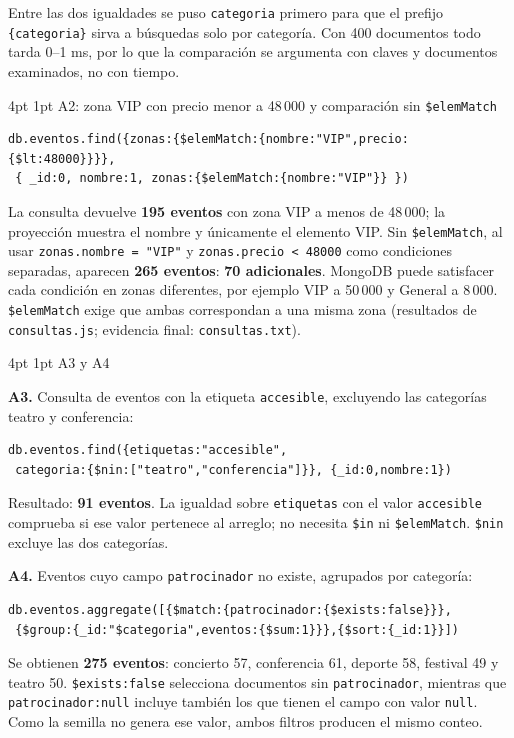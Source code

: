 \documentclass[10pt,letterpaper]{article}
\makeatletter
\renewcommand\subsection{\@startsection{subsection}{2}{\z@}%
  {4pt \@plus 1pt}{1pt}%
  {\normalfont\small\bfseries\color{acc}}}
\makeatother
\begin{document}
Entre las dos igualdades se puso \texttt{categoria} primero para que el prefijo \texttt{\{categoria\}} sirva a
búsquedas solo por categoría. Con 400 documentos todo tarda 0--1 ms, por lo que la comparación se argumenta
con claves y documentos examinados, no con tiempo.

\subsection{A2: zona VIP con precio menor a 48\,000 y comparación sin \texttt{\$elemMatch}}

{\footnotesize\begin{verbatim}
db.eventos.find({zonas:{$elemMatch:{nombre:"VIP",precio:{$lt:48000}}}},
 { _id:0, nombre:1, zonas:{$elemMatch:{nombre:"VIP"}} })
\end{verbatim}}
La consulta devuelve \textbf{195 eventos} con zona VIP a menos de 48\,000; la proyección
muestra el nombre y únicamente el elemento VIP. Sin \texttt{\$elemMatch}, al usar
\texttt{zonas.nombre = "VIP"} y \texttt{zonas.precio < 48000} como condiciones
separadas, aparecen \textbf{265 eventos}: \textbf{70 adicionales}. MongoDB puede
satisfacer cada condición en zonas diferentes, por ejemplo VIP a 50\,000 y
General a 8\,000. \texttt{\$elemMatch} exige que ambas correspondan a una
misma zona (resultados de \texttt{consultas.js}; evidencia final: \texttt{consultas.txt}).


\subsection{A3 y A4}

\textbf{A3.} Consulta de eventos con la etiqueta \texttt{accesible}, excluyendo las
categorías teatro y conferencia:
{\footnotesize\begin{verbatim}
db.eventos.find({etiquetas:"accesible",
 categoria:{$nin:["teatro","conferencia"]}}, {_id:0,nombre:1})
\end{verbatim}}
Resultado: \textbf{91 eventos}. La igualdad sobre \texttt{etiquetas} con el valor \texttt{accesible}
comprueba si ese valor pertenece al arreglo; no necesita \texttt{\$in} ni
\texttt{\$elemMatch}. \texttt{\$nin} excluye las dos categorías.

\pagebreak
\textbf{A4.} Eventos cuyo campo \texttt{patrocinador} no existe, agrupados por categoría:
{\footnotesize\begin{verbatim}
db.eventos.aggregate([{$match:{patrocinador:{$exists:false}}},
 {$group:{_id:"$categoria",eventos:{$sum:1}}},{$sort:{_id:1}}])
\end{verbatim}}
Se obtienen \textbf{275 eventos}: concierto 57, conferencia 61, deporte 58,
festival 49 y teatro 50. \texttt{\$exists:false} selecciona documentos sin
\texttt{patrocinador}, mientras que \texttt{patrocinador:null} incluye también
los que tienen el campo con valor \texttt{null}. Como la semilla no genera ese
valor, ambos filtros producen el mismo conteo.
\end{document}
